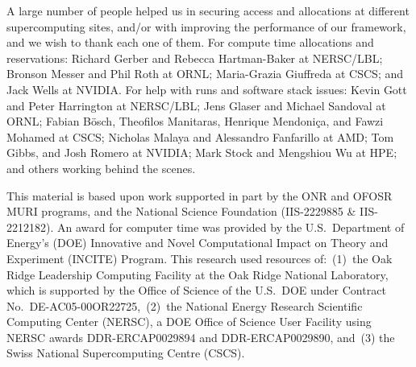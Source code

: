 A large number of people helped us in securing access and allocations at
different supercomputing sites, and/or with improving the performance of our
framework, and we wish to thank each one of them. For compute time allocations
and reservations: Richard Gerber and Rebecca Hartman-Baker at NERSC/LBL;
Bronson Messer and Phil Roth at ORNL; Maria-Grazia Giuffreda at CSCS; and Jack
Wells at NVIDIA. For help with runs and software stack issues: Kevin Gott and
Peter Harrington at NERSC/LBL; Jens Glaser and Michael Sandoval at ORNL; Fabian
B\"osch, Theofilos Manitaras, Henrique Mendoni\c{c}a, and Fawzi Mohamed at
CSCS; Nicholas Malaya and Alessandro Fanfarillo at AMD; Tom Gibbs, and Josh
Romero at NVIDIA; Mark Stock and Mengshiou Wu at HPE; and others working behind
the scenes.

This material is based upon work supported in part by the ONR and OFOSR MURI
programs, and the National Science Foundation (IIS-2229885 \& IIS-2212182).  An
award for computer time was provided by the U.S.~Department of Energy’s (DOE)
Innovative and Novel Computational Impact on Theory and Experiment (INCITE)
Program. This research used resources of:~(1)~the Oak Ridge Leadership
Computing Facility at the Oak Ridge National Laboratory, which is supported by
the Office of Science of the U.S.~DOE under Contract
No.~DE-AC05-00OR22725,~(2)~the National Energy Research Scientific Computing
Center (NERSC), a DOE Office of Science User Facility using NERSC awards
DDR-ERCAP0029894 and DDR-ERCAP0029890, and~(3) the Swiss National
Supercomputing Centre (CSCS).

